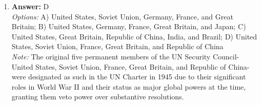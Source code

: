 \documentclass[12pt]{article}
\begin{document}
\begin{enumerate}[label=\arabic*.]
\\ \textit{Options:} A) Creation of the Department of Homeland Security; B) Moving the Department of Defense Intelligence Agencies to the CIA for better coordination; C) Creation of the National Intelligence Director; D) Moving the domestic intelligence component of the FBI to the CIA
\\ \textit{Note:} The 9/11 Commission proposed the creation of the National Intelligence Director to centralize and enhance the coordination of the U.S. intelligence community, addressing the fragmented oversight that contributed to the failures leading up to the September 11 attacks.
\item \textbf{Answer:} D
\\ \textit{Options:} A) United States, Soviet Union, Germany, France, and Great Britain; B) United States, Germany, France, Great Britain, and Japan; C) United States, Great Britain, Republic of China, India, and Brazil; D) United States, Soviet Union, France, Great Britain, and Republic of China
\\ \textit{Note:} The original five permanent members of the UN Security Council-United States, Soviet Union, France, Great Britain, and Republic of China-were designated as such in the UN Charter in 1945 due to their significant roles in World War II and their status as major global powers at the time, granting them veto power over substantive resolutions.
\end{enumerate}
\end{document}
